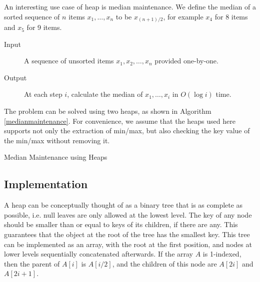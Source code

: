 An interesting use case of heap is median maintenance. We define the median of a sorted sequence of $n$ items $x_1,\dots,x_n$ to be $x_{(n+1)/2}$, for example $x_4$ for 8 items and $x_5$ for 9 items. 
\begin{description}
\item[Input]A sequence of unsorted items $x_1,x_2,\dots,x_n$ provided one-by-one.
\item[Output]At each step $i$, calculate the median of $x_1,\dots,x_i$ in $O(\log i)$ time.
\end{description}
The problem can be solved using two heaps, as shown in Algorithm \ref{medianmaintenance}. For convenience, we assume that the heaps used here supports not only the extraction of min/max, but also checking the key value of the min/max without removing it.
\begin{algorithm}[ht]
\caption{Median Maintenance using Heaps}\label{medianmaintenance}
\begin{algorithmic}[1]
\InputOutput{}
\Else{}
\EndIf
{}
\EndIf
{}
\Else{}
\EndIf
\EndFor
\end{algorithmic}
\end{algorithm}
\subsection{Implementation}
A heap can be conceptually thought of as a binary tree that is as complete as possible, i.e. null leaves are only allowed at the lowest level. The key of any node should be smaller than or equal to keys of its children, if there are any. This guarantees that the object at the root of the tree has the smallest key. This tree can be implemented as an array, with the root at the first position, and nodes at lower levels sequentially concatenated afterwards. If the array $A$ is 1-indexed, then the parent of $A[i]$ is $A[i/2]$, and the children of this node are $A[2i]$ and $A[2i+1]$.

